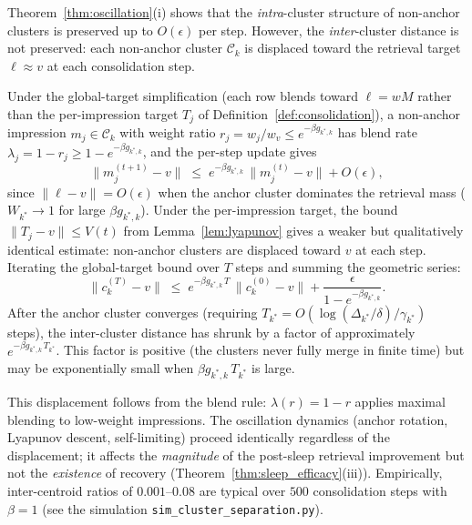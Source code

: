 \begin{remark}
\label{rem:inter_cluster_displacement}
\leanok
{}
Theorem~\ref{thm:oscillation}(i) shows that the \emph{intra}-cluster structure of non-anchor clusters is preserved up to $O(\epsilon)$ per step.  However, the \emph{inter}-cluster distance is not preserved: each non-anchor cluster $\mathcal{C}_k$ is displaced toward the retrieval target $\ell \approx v$ at each consolidation step.

Under the global-target simplification (each row blends toward $\ell = wM$ rather than the per-impression target $T_j$ of Definition~\ref{def:consolidation}), a non-anchor impression $m_j \in \mathcal{C}_k$ with weight ratio $r_j = w_j/w_v \leq e^{-\beta g_{k^*,k}}$ has blend rate $\lambda_j = 1 - r_j \geq 1 - e^{-\beta g_{k^*,k}}$, and the per-step update gives
\[
\|m_j^{(t+1)} - v\| \;\leq\; e^{-\beta g_{k^*,k}}\,\|m_j^{(t)} - v\| + O(\epsilon),
\]
since $\|\ell - v\| = O(\epsilon)$ when the anchor cluster dominates the retrieval mass ($W_{k^*} \to 1$ for large $\beta g_{k^*,k}$).  Under the per-impression target, the bound $\|T_j - v\| \leq V(t)$ from Lemma~\ref{lem:lyapunov} gives a weaker but qualitatively identical estimate: non-anchor clusters are displaced toward $v$ at each step.  Iterating the global-target bound over $T$ steps and summing the geometric series:
\[
\|c_k^{(T)} - v\| \;\leq\; e^{-\beta g_{k^*,k}\,T}\,\|c_k^{(0)} - v\| + \frac{\epsilon}{1 - e^{-\beta g_{k^*,k}}}.
\]
After the anchor cluster converges (requiring $T_{k^*} = O(\log(\Delta_{k^*}/\delta)/\gamma_{k^*})$ steps), the inter-cluster distance has shrunk by a factor of approximately $e^{-\beta g_{k^*,k}\,T_{k^*}}$.  This factor is positive (the clusters never fully merge in finite time) but may be exponentially small when $\beta g_{k^*,k}\,T_{k^*}$ is large.

This displacement follows from the blend rule: $\lambda(r) = 1 - r$ applies maximal blending to low-weight impressions.  The oscillation dynamics (anchor rotation, Lyapunov descent, self-limiting) proceed identically regardless of the displacement; it affects the \emph{magnitude} of the post-sleep retrieval improvement but not the \emph{existence} of recovery (Theorem~\ref{thm:sleep_efficacy}(iii)).  Empirically, inter-centroid ratios of $0.001$--$0.08$ are typical over $500$ consolidation steps with $\beta = 1$ (see the simulation \texttt{sim\_cluster\_separation.py}).
\end{remark}

